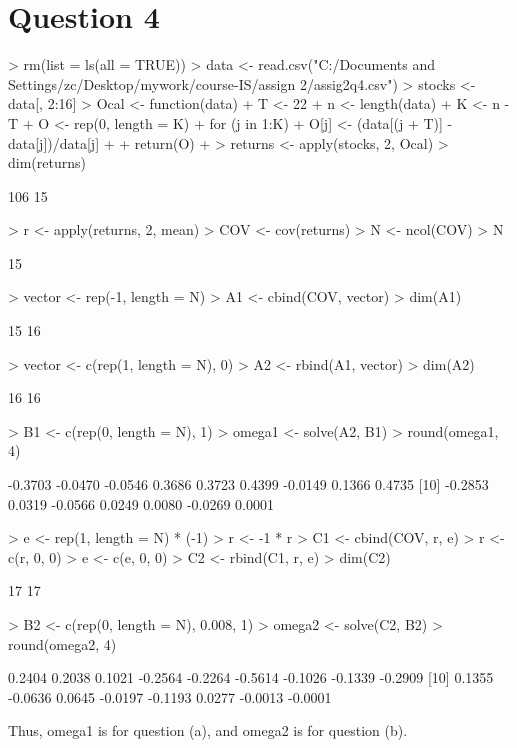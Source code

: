 \documentclass[a4paper,12pt]{article}
\begin{document}
\section*{Question 4}
\begin{Schunk}
\begin{Sinput}
> rm(list = ls(all = TRUE))
> data <- read.csv("C:/Documents and Settings/zc/Desktop/mywork/course-IS/assign 2/assig2q4.csv")
> stocks <- data[, 2:16]
> Ocal <- function(data) {
+     T <- 22
+     n <- length(data)
+     K <- n - T
+     O <- rep(0, length = K)
+     for (j in 1:K) {
+         O[j] <- (data[(j + T)] - data[j])/data[j]
+     }
+     return(O)
+ }
> returns <- apply(stocks, 2, Ocal)
> dim(returns)
\end{Sinput}
\begin{Soutput}
[1] 106  15
\end{Soutput}
\begin{Sinput}
> r <- apply(returns, 2, mean)
> COV <- cov(returns)
> N <- ncol(COV)
> N
\end{Sinput}
\begin{Soutput}
[1] 15
\end{Soutput}
\begin{Sinput}
> vector <- rep(-1, length = N)
> A1 <- cbind(COV, vector)
> dim(A1)
\end{Sinput}
\begin{Soutput}
[1] 15 16
\end{Soutput}
\begin{Sinput}
> vector <- c(rep(1, length = N), 0)
> A2 <- rbind(A1, vector)
> dim(A2)
\end{Sinput}
\begin{Soutput}
[1] 16 16
\end{Soutput}
\begin{Sinput}
> B1 <- c(rep(0, length = N), 1)
> omega1 <- solve(A2, B1)
> round(omega1, 4)
\end{Sinput}
\begin{Soutput}
 [1] -0.3703 -0.0470 -0.0546  0.3686  0.3723  0.4399 -0.0149  0.1366  0.4735
[10] -0.2853  0.0319 -0.0566  0.0249  0.0080 -0.0269  0.0001
\end{Soutput}
\begin{Sinput}
> e <- rep(1, length = N) * (-1)
> r <- -1 * r
> C1 <- cbind(COV, r, e)
> r <- c(r, 0, 0)
> e <- c(e, 0, 0)
> C2 <- rbind(C1, r, e)
> dim(C2)
\end{Sinput}
\begin{Soutput}
[1] 17 17
\end{Soutput}
\begin{Sinput}
> B2 <- c(rep(0, length = N), 0.008, 1)
> omega2 <- solve(C2, B2)
> round(omega2, 4)
\end{Sinput}
\begin{Soutput}
 [1]  0.2404  0.2038  0.1021 -0.2564 -0.2264 -0.5614 -0.1026 -0.1339 -0.2909
[10]  0.1355 -0.0636  0.0645 -0.0197 -0.1193  0.0277 -0.0013 -0.0001
\end{Soutput}
\end{Schunk}
Thus, omega1 is for question (a), and omega2 is for question (b).
\end{document}
